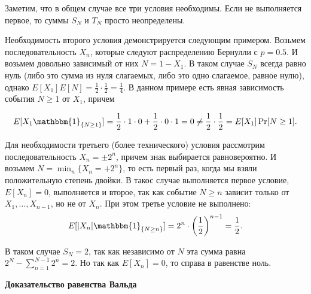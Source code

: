 \documentclass[12pt]{article}
\newcommand\one{\mathbbm{1}}
\begin{document}
Заметим, что в общем случае все три условия необходимы. Если не выполняется первое, то суммы $S_N$ и $T_N$ просто неопределены. 

Необходимость второго условия демонстрируется следующим примером. Возьмем последовательность $X_n$, которые следуют распределению Бернулли с $p = 0.5$. И возьмем довольно зависимый от них $N = 1 - X_1$. В таком случае $S_N$ всегда равно нуль (либо это сумма из нуля слагаемых, либо это одно слагаемое, равное нулю), однако $E[X_1]E[N] = \frac{1}{2} \cdot \frac{1}{2} = \frac{1}{4}$. В данном примере есть явная зависимость события $N \ge 1$ от $X_1$, причем 

\begin{align*}
  E[X_1 \one_{\{N \ge 1\}}] = \frac{1}{2} \cdot 1 \cdot 0 + \frac{1}{2} \cdot 0 \cdot 1 = 0 \ne \frac{1}{2} \cdot \frac{1}{2} = E[X_1] \Pr[N \ge 1].
\end{align*}

Для необходимости третьего (более технического) условия рассмотрим последовательность $X_n = \pm 2^n$, причем знак выбирается равновероятно. И возьмем $N = \min_n \{X_n = +2^n\}$, то есть первый раз, когда мы взяли положительную степень двойки. В такос случае выполняется первое условие, $E[X_n] = 0$, выполняется и второе, так как событие $N \ge n$ зависит только от $X_1, \dots, X_{n - 1}$, но не от $X_n$. При этом третье условие не выполнено:
\begin{align*}
  E[|X_n|\one_{\{N \ge n\}}] = 2^n \cdot \left(\frac{1}{2}\right)^{n - 1} = \frac{1}{2}.
\end{align*}

В таком случае $S_N = 2$, так как независимо от $N$ эта сумма равна $2^N - \sum_{n = 1}^{N - 1} 2^n = 2$. Но так как $E[X_n] = 0$, то справа в равенстве ноль.

\textbf{Доказательство равенства Вальда}
\end{document}
